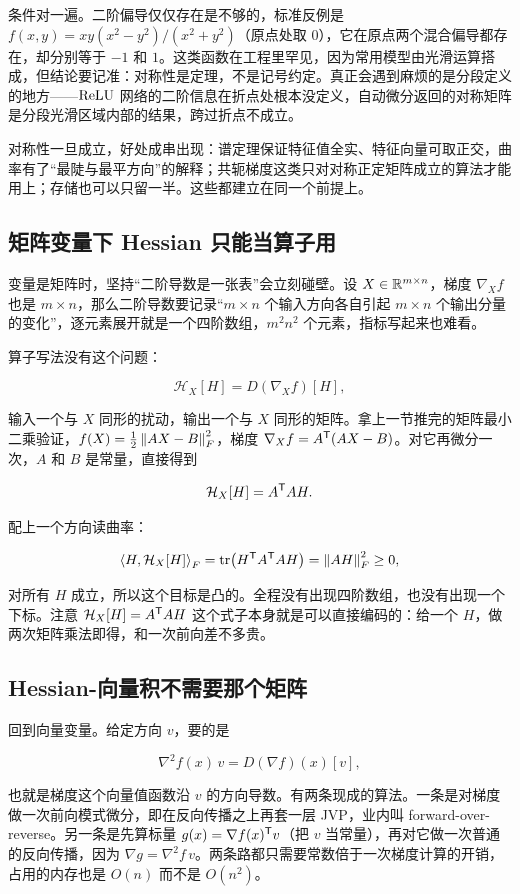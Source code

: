 条件对一遍。二阶偏导仅仅存在是不够的，标准反例是 \(f(x,y)=xy(x^2-y^2)/(x^2+y^2)\)（原点处取 \(0\)），它在原点两个混合偏导都存在，却分别等于 \(-1\) 和 \(1\)。这类函数在工程里罕见，因为常用模型由光滑运算搭成，但结论要记准：对称性是定理，不是记号约定。真正会遇到麻烦的是分段定义的地方——\(\operatorname{ReLU}\) 网络的二阶信息在折点处根本没定义，自动微分返回的对称矩阵是分段光滑区域内部的结果，跨过折点不成立。

对称性一旦成立，好处成串出现：谱定理保证特征值全实、特征向量可取正交，曲率有了``最陡与最平方向''的解释；共轭梯度这类只对对称正定矩阵成立的算法才能用上；存储也可以只留一半。这些都建立在同一个前提上。

\subsection{矩阵变量下 Hessian 只能当算子用}

变量是矩阵时，坚持``二阶导数是一张表''会立刻碰壁。设 \(X\in\mathbb{R}^{m\times n}\)，梯度 \(\nabla_Xf\) 也是 \(m\times n\)，那么二阶导数要记录``\(m\times n\) 个输入方向各自引起 \(m\times n\) 个输出分量的变化''，逐元素展开就是一个四阶数组，\(m^2n^2\) 个元素，指标写起来也难看。

算子写法没有这个问题：

\[
\mathcal H_X[H]=D(\nabla_Xf)[H],
\]

输入一个与 \(X\) 同形的扰动，输出一个与 \(X\) 同形的矩阵。拿上一节推完的矩阵最小二乘验证，\(f(X)=\tfrac12\left\lVert AX-B\right\rVert_F^2\)，梯度 \(\nabla_Xf=A^{\mathsf{T}}(AX-B)\)。对它再微分一次，\(A\) 和 \(B\) 是常量，直接得到

\[
\mathcal H_X[H]=A^{\mathsf{T}}AH.
\]

配上一个方向读曲率：

\[
\left\langle H,\mathcal H_X[H]\right\rangle_F=\operatorname{tr}\bigl(H^{\mathsf{T}}A^{\mathsf{T}}AH\bigr)=\left\lVert AH\right\rVert_F^2\ge0,
\]

对所有 \(H\) 成立，所以这个目标是凸的。全程没有出现四阶数组，也没有出现一个下标。注意 \(\mathcal H_X[H]=A^{\mathsf{T}}AH\) 这个式子本身就是可以直接编码的：给一个 \(H\)，做两次矩阵乘法即得，和一次前向差不多贵。

\subsection{Hessian-向量积不需要那个矩阵}

回到向量变量。给定方向 \(v\)，要的是

\[
\nabla^2f(x)\,v=D(\nabla f)(x)[v],
\]

也就是梯度这个向量值函数沿 \(v\) 的方向导数。有两条现成的算法。一条是对梯度做一次前向模式微分，即在反向传播之上再套一层 JVP，业内叫 forward-over-reverse。另一条是先算标量 \(g(x)=\nabla f(x)^{\mathsf{T}}v\)（把 \(v\) 当常量），再对它做一次普通的反向传播，因为 \(\nabla g=\nabla^2f\,v\)。两条路都只需要常数倍于一次梯度计算的开销，占用的内存也是 \(O(n)\) 而不是 \(O(n^2)\)。

